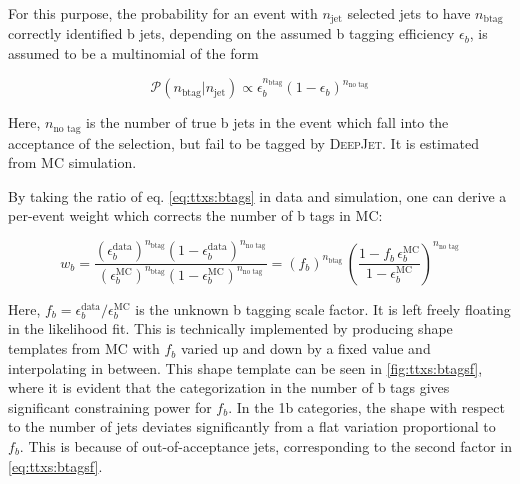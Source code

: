 For this purpose, the probability for an event with $n_{\mathrm{jet}}$ selected jets to have $n_{\mathrm{b tag}}$ correctly identified b jets, depending on the assumed b tagging efficiency $\epsilon_b$, is assumed to be a multinomial of the form

\begin{equation}
\label{eq:ttxs:btags}
    \mathcal{P} (n_{\mathrm{b tag}} | n_{\mathrm{jet}}) \propto \epsilon_b^{n_{\mathrm{b tag}}} (1 - \epsilon_b)^{ n_{\text{no tag}}}
\end{equation}

Here, $n_{\text{no tag}}$ is the number of true b jets in the event which fall into the acceptance of the selection, but fail to be tagged by \textsc{DeepJet}. It is estimated from MC simulation. %

By taking the ratio of eq. \ref{eq:ttxs:btags} in data and simulation, one can derive a per-event weight which corrects the number of b tags in MC:

\begin{equation}
\label{eq:ttxs:btagsf}
    w_b = \frac
    {(\epsilon_b^{\mathrm{data}})^{n_{\mathrm{b tag}}} (1 - \epsilon_b^{\mathrm{data}})^{n_{\text{no tag}}}}
    {(\epsilon_b^{\mathrm{MC}})^{n_{\mathrm{b tag}}} (1 - \epsilon_b^{\mathrm{MC}})^{n_{\text{no tag}}}} 
    = (f_b)^{n_{\mathrm{b tag}}} \, \left( \frac{1 - f_b \, \epsilon_b^{\mathrm{MC}}}{1 - \epsilon_b^{\mathrm{MC}}} \right)^{n_{\text{no tag}}}
\end{equation}

Here, $f_b = \epsilon_b^{\mathrm{data}}/\epsilon_b^{\mathrm{MC}}$ is the unknown b tagging scale factor. It is left freely floating in the likelihood fit. This is technically implemented by producing shape templates from MC with $f_b$ varied up and down by a fixed value and interpolating in between. This shape template can be seen in \cref{fig:ttxs:btagsf}, where it is evident that the categorization in the number of b tags gives significant constraining power for $f_b$. In the 1b categories, the shape with respect to the number of jets deviates significantly from a flat variation proportional to $f_b$. This is because of out-of-acceptance jets, corresponding to the second factor in \cref{eq:ttxs:btagsf}.

